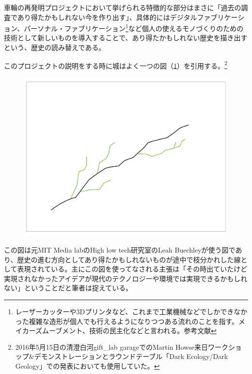\documentclass[a4paper,report]{jsbook}
\begin{document}
車輪の再発明プロジェクトにおいて挙げられる特徴的な部分はまさに「過去の調査であり得たかもしれない今を作り出す」、具体的にはデジタルファブリケーション、パーソナル・ファブリケーション\footnote{レーザーカッターや3Dプリンタなど、これまで工業機械などでしかできなかった複雑な造形が個人でも行えるようになりつつある流れのことを指す。メイカーズムーブメント、技術の民主化などと言われる。参考文献\autocite{fab:tanaka}}など個人の使えるモノづくりのための技術として新しいものを導入することで、あり得たかもしれない歴史を描き出すという、歴史の読み替えである。

このプロジェクトの説明をする時に城はよく一つの図（\cref{fig:leah}）を引用する。\footnote{2016年5月15日の清澄白河gift\_lab
  garageでのMartin
  Howse来日ワークショップ\&デモンストレーションとラウンドテーブル「Dark
  Ecology/Dark Geology」での発表においても使用していた。}\\
\autocite{soundstudies3}

\begin{figure}[htbp]
\centering
\includegraphics[width=1.00000\textwidth]{./img/leah_sideway.jpg}
\caption{\label{fig:leah}}
\end{figure}

\autocite{leah:slide}

この図は元MIT Media labのHigh low tech研究室のLeah
Buechleyが使う図であり、歴史の進む方向としてあり得たかもしれないものが途中で枝分かれした線として表現されている。主にこの図を使ってなされる主張は「その時出ていたけど実現されなかったアイデアが現代のテクノロジーや環境では実現できるかもしれない」ということだと筆者は捉えている。
\end{document}
